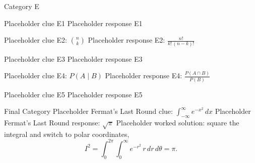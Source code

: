 \documentclass{article}
\begin{document}
\begin{category}{Category E}
  \begin{clue}
    Placeholder clue E1
  \response
    Placeholder response E1
  \end{clue}
  \begin{clue}
    Placeholder clue E2: $\binom{n}{k}$
  \response
    Placeholder response E2: $\frac{n!}{k!\,(n-k)!}$
  \end{clue}
  \begin{clue}
    Placeholder clue E3
  \response
    Placeholder response E3
  \end{clue}
  \begin{clue}
    Placeholder clue E4: $P(A \mid B)$
  \response
    Placeholder response E4: $\frac{P(A \cap B)}{P(B)}$
  \end{clue}
  \begin{clue}
    Placeholder clue E5
  \response
    Placeholder response E5
  \end{clue}
\end{category}

\begin{final}{Final Category}
  Placeholder Fermat's Last Round clue: $\displaystyle\int_{-\infty}^{\infty} e^{-x^2}\,dx$
\response
  Placeholder Fermat's Last Round response: $\sqrt{\pi}$
\solution
  Placeholder worked solution: square the integral and switch to polar coordinates,
  \[ I^2 = \int_0^{2\pi}\!\!\int_0^\infty e^{-r^2}\, r\,dr\,d\theta = \pi. \]
\end{final}
\end{document}

